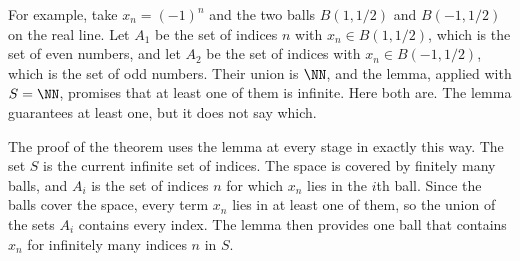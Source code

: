 For example, take $x_n=(-1)^n$ and the two balls $B(1,1/2)$ and $B(-1,1/2)$ on the real line. Let $A_1$ be the set of indices $n$ with $x_n\in B(1,1/2)$, which is the set of even numbers, and let $A_2$ be the set of indices with $x_n\in B(-1,1/2)$, which is the set of odd numbers. Their union is $\NN$, and the lemma, applied with $S=\NN$, promises that at least one of them is infinite. Here both are. The lemma guarantees at least one, but it does not say which.

The proof of the theorem uses the lemma at every stage in exactly this way. The set $S$ is the current infinite set of indices. The space is covered by finitely many balls, and $A_i$ is the set of indices $n$ for which $x_n$ lies in the $i$th ball. Since the balls cover the space, every term $x_n$ lies in at least one of them, so the union of the sets $A_i$ contains every index. The lemma then provides one ball that contains $x_n$ for infinitely many indices $n$ in $S$.
